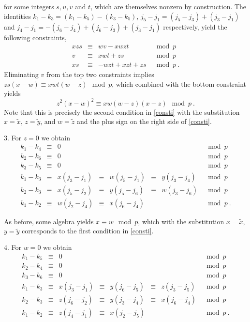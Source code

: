 for some integers $s,u,v$ and $t$, which are themselves nonzero by
construction. The identities $k_1-k_3=(k_1-k_5)-(k_3-k_5)$,
$j_5-j_1=(j_5-j_3)+(j_3-j_1)$ and
$j_4-j_1=-(j_6-j_4)+(j_6-j_3)+(j_3-j_1)$ respectively, yield the
following constraints,
\begin{equation}\begin{array}{cccc}
xzs &\equiv &wv-xwzt &\mod p \\
v &\equiv &xwt+zs &\mod p \\
xs & \equiv& -wzt +xzt+zs &\mod p~.
\end{array}\end{equation}
Eliminating $v$ from the top two constraints implies $zs(x-w)
\equiv xwt(w-z) \mod p$, which combined with the bottom constraint
yields
\begin{equation}
z^2(x-w)^2 \equiv xw(w-z)(x-z) \mod p~.
\end{equation}
Note that this is precisely the second condition in \eqref{consti}
with the substitution $x=\tilde{x}$, $z=\tilde{y}$, and
$w=\tilde{z}$ and the plus sign on the right side of
\eqref{consti}.

3. For $z=0$ we obtain
\begin{equation}\begin{array}{ccccccccc}
k_1-k_4 &\equiv& 0 & {}& {}&{}&{}&\mod p
\\
k_2-k_6 &\equiv& 0 & {}& {}&{}&{}&\mod p\\
k_3-k_5 &\equiv& 0 & {}& {}&{}&{}&\mod p\\
k_1-k_3 &\equiv& x(j_3-j_1)& \equiv& w(j_5-j_1)& \equiv&
y(j_3-j_4) &\mod p
\\
k_2-k_3 &\equiv& x(j_5-j_2) &\equiv&  y(j_5-j_6) &\equiv&
w(j_3-j_6) &\mod
p\\
k_1-k_2 &\equiv& w(j_2-j_4) &\equiv& x(j_6-j_4) & {}&{}&\mod p~.
\end{array}\end{equation}


As before, some algebra yields $x\equiv w \mod p$, which with the
substitution $x=\tilde{x}$, $y=\tilde{y}$ corresponds to the first
condition in \eqref{consti}.

 4. For $w=0$ we obtain
\begin{equation}\begin{array}{ccccccccc}
k_1-k_5 &\equiv& 0 & {}& {}&{}&{}&\mod p
\\
k_2-k_4 &\equiv& 0 & {}& {}&{}&{}&\mod p\\
k_3-k_6 &\equiv& 0 & {}& {}&{}&{}&\mod p\\
k_1-k_3 &\equiv& x(j_3-j_1)& \equiv& y(j_6-j_5)& \equiv&
z(j_3-j_5) &\mod p
\\
k_2-k_3 &\equiv& z(j_6-j_2) &\equiv&  y(j_3-j_4) &\equiv&
x(j_6-j_4) &\mod
p\\
k_1-k_2 &\equiv& z(j_4-j_1) &\equiv& x(j_2-j_5) & {}&{}&\mod p~.
\end{array}\end{equation}

